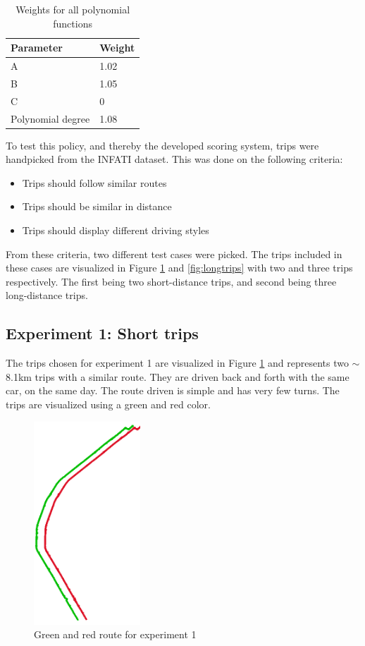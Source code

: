 \begin{table}
    \centering
    \begin{tabular}{ll}
    \textbf{Parameter} & \textbf{Weight} \\ \hline
    A                  & 1.02            \\
    B                  & 1.05            \\
    C                  & 0               \\
    Polynomial degree  & 1.08            \\ \hline
    \end{tabular}
    \caption{Weights for all polynomial functions}
    \label{tab:polyvalues}
\end{table}

To test this policy, and thereby the developed scoring system, trips were handpicked from the INFATI dataset\cite{art:INFATI}. This was done on the following criteria:

\begin{itemize}
  \item Trips should follow similar routes
  \item Trips should be similar in distance
  \item Trips should display different driving styles
\end{itemize}

From these criteria, two different test cases were picked. The trips included in these cases are visualized in Figure \ref{fig:shorttrips} and \ref{fig:longtrips} with two and three trips respectively. The first being two short-distance trips, and second being three long-distance trips.

\subsection{Experiment 1: Short trips} \label{subsec:expe1}
The trips chosen for experiment 1 are visualized in Figure \ref{fig:shorttrips} and represents two $\sim$8.1km trips with a similar route. They are driven back and forth with the same car, on the same day. The route driven is simple and has very few turns. The trips are visualized using a green and red color.

\begin{figure}[tb]
    \centering
    \includegraphics[width=40mm]{Pictures/ShortTrips.png}
    \caption{Green and red route for experiment 1}
    \label{fig:shorttrips}
\end{figure}

